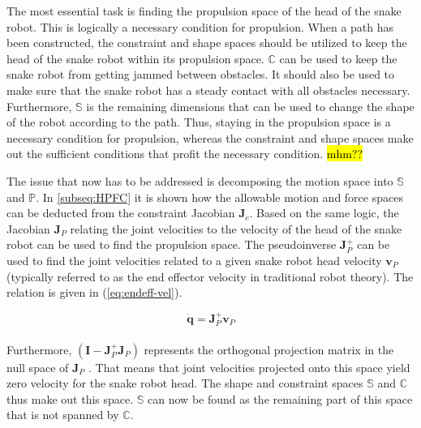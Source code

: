 The most essential task is finding the propulsion space of the head of the snake robot. This is logically a necessary condition for propulsion. When a path has been constructed, the constraint and shape spaces should be utilized to keep the head of the snake robot within its propulsion space. $\mathbb{C}$ can be used to keep the snake robot from getting jammed between obstacles. It should also be used to make sure that the snake robot has a steady contact with all obstacles necessary. Furthermore, $\mathbb{S}$ is the remaining dimensions that can be used to change the shape of the robot according to the path. Thus, staying in the propulsion space is a necessary condition for propulsion, whereas the constraint and shape spaces make out the sufficient conditions that profit the necessary condition. \hl{mhm??}

The issue that now has to be addressed is decomposing the motion space into $\mathbb{S}$ and $\mathbb{P}$. In \ref{subseq:HPFC} it is shown how the allowable motion and force spaces can be deducted from the constraint Jacobian $\mathbf{J}_c$. Based on the same logic, the Jacobian $\mathbf{J}_P$ relating the joint velocities to the velocity of the head of the snake robot can be used to find the propulsion space. The pseudoinverse $\mathbf{J}^+_P$ can be used to find the joint velocities related to a given snake robot head velocity $\mathbf{v}_P$ (typically referred to as the end effector velocity in traditional robot theory). The relation is given in (\ref{eq:endeff-vel}).

\begin{equation}\label{eq:endeff-vel}
    \dot{\mathbf{q}} = \mathbf{J}^+_P \mathbf{v}_P
\end{equation}
\\
Furthermore, $(\mathbf{I} - \mathbf{J}^+_P \mathbf{J}_P)$ represents the orthogonal projection matrix in the null space of $\mathbf{J}_P$ \cite{chiaverini2008kinematically}. That means that joint velocities projected onto this space yield zero velocity for the snake robot head. The shape and constraint spaces $\mathbb{S}$ and $\mathbb{C}$ thus make out this space. $\mathbb{S}$ can now be found as the remaining part of this space that is not spanned by $\mathbb{C}$.